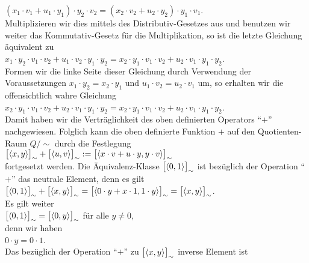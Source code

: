 \hspace*{1.3cm}
$(x_1 \cdot v_1 + u_1 \cdot y_1) \cdot y_2 \cdot v_2 = 
 (x_2 \cdot v_2 + u_2 \cdot y_2) \cdot y_1 \cdot v_1
$.
\\[0.2cm]
Multiplizieren wir dies mittels des Distributiv-Gesetzes aus und benutzen wir weiter das
Kommutativ-Gesetz für die Multiplikation, so ist die letzte Gleichung äquivalent zu
\\[0.2cm]
\hspace*{1.3cm}
$x_1 \cdot y_2 \cdot v_1 \cdot v_2 + u_1 \cdot v_2 \cdot y_1 \cdot y_2 = 
 x_2 \cdot y_1 \cdot v_1 \cdot v_2 + u_2 \cdot v_1 \cdot y_1 \cdot y_2
$.
\\[0.2cm]
Formen wir die linke Seite dieser Gleichung durch Verwendung der Voraussetzungen 
$x_1 \cdot y_2 = x_2 \cdot y_1$  und $u_1 \cdot v_2 = u_2 \cdot v_1$ um, so erhalten wir
die offensichtlich wahre Gleichung
\\[0.2cm]
\hspace*{1.3cm}
$x_2 \cdot y_1 \cdot v_1 \cdot v_2 + u_2 \cdot v_1 \cdot y_1 \cdot y_2 = 
 x_2 \cdot y_1 \cdot v_1 \cdot v_2 + u_2 \cdot v_1 \cdot y_1 \cdot y_2
$.
\\[0.2cm]
Damit haben wir die Verträglichkeit des oben definierten Operators ``$+$'' nachgewiesen.
Folglich kann die oben definierte Funktion $+$ auf den Quotienten-Raum $Q/\!\sim$ durch die Festlegung
\\[0.2cm]
\hspace*{1.3cm}
$\bigl[\pair(x,y)\bigr]_\sim + \bigl[\pair(u,v)\bigr]_\sim := 
 \bigl[\pair(x \cdot v + u \cdot y, y \cdot v)\bigr]_\sim
$
\\[0.2cm]
fortgesetzt werden.  Die Äquivalenz-Klasse
$\bigl[\pair(0,1)\bigr]_\sim$
ist bezüglich der Operation ``$+$'' das neutrale Element, denn es gilt
\\[0.2cm]
\hspace*{1.3cm}
$\bigl[\pair(0,1)\bigr]_\sim + \bigl[\pair(x,y)\bigr]_\sim = 
 \bigl[\pair(0 \cdot y + x \cdot 1, 1 \cdot y)\bigr]_\sim = 
 \bigl[\pair(x, y)\bigr]_\sim
$.
\\[0.2cm]
Es gilt weiter
\\[0.2cm]
\hspace*{1.3cm}
$\bigl[\pair(0,1)\bigr]_\sim = \bigl[\pair(0,y)\bigr]_\sim$ \quad für alle $y \not= 0$,
\\[0.2cm]
denn wir haben
\\[0.2cm]
\hspace*{1.3cm}
$0 \cdot y = 0 \cdot 1$.
\\[0.2cm]
Das bezüglich der Operation ``$+$'' zu $\bigl[\pair(x,y)\bigr]_\sim$ inverse Element ist
